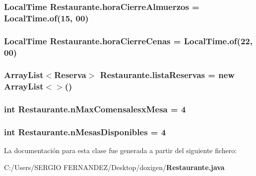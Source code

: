 \subsubsection[{horaCierreAlmuerzos}]{\setlength{\rightskip}{0pt plus 5cm}LocalTime {\bf Restaurante.horaCierreAlmuerzos} = LocalTime.of(15, 00)\hspace{0.3cm}{\tt  [package]}}\label{class_restaurante_7bbca7e23613ab57b5e4eac3dea1e754}


\subsubsection[{horaCierreCenas}]{\setlength{\rightskip}{0pt plus 5cm}LocalTime {\bf Restaurante.horaCierreCenas} = LocalTime.of(22, 00)\hspace{0.3cm}{\tt  [package]}}\label{class_restaurante_3239f8f422ac6871eba756a93afdc2bf}


\subsubsection[{listaReservas}]{\setlength{\rightskip}{0pt plus 5cm}ArrayList$<${\bf Reserva}$>$ {\bf Restaurante.listaReservas} = new ArrayList$<$$>$()\hspace{0.3cm}{\tt  [package]}}\label{class_restaurante_405ccdc4209ca3aea4601d4ad0c096e0}


\subsubsection[{nMaxComensalesxMesa}]{\setlength{\rightskip}{0pt plus 5cm}int {\bf Restaurante.nMaxComensalesxMesa} = 4\hspace{0.3cm}{\tt  [package]}}\label{class_restaurante_635ec2326fef3062f746abca1c1487e7}


\subsubsection[{nMesasDisponibles}]{\setlength{\rightskip}{0pt plus 5cm}int {\bf Restaurante.nMesasDisponibles} = 4\hspace{0.3cm}{\tt  [package]}}\label{class_restaurante_21bd6b110ddb599f2abe6525c13d3cd7}




La documentación para esta clase fue generada a partir del siguiente fichero:\begin{CompactItemize}
\item 
C:/Users/SERGIO FERNANDEZ/Desktop/doxigen/{\bf Restaurante.java}\end{CompactItemize}
